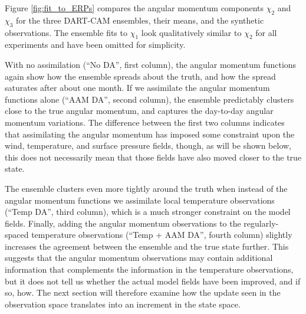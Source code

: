 Figure \ref{fig:fit_to_ERPs} compares the angular momentum components $\chi_2$ and $\chi_3$ for the three DART-CAM ensembles, their means, and the synthetic observations.
The ensemble fits to $\chi_1$ look qualitatively similar to $\chi_2$ for all experiments and have been omitted for simplicity. 

With no assimilation (``No DA'', first column), the angular momentum functions again show how the ensemble spreads about the truth, and how the spread saturates after about one month.
If we assimilate the angular momentum functions alone (``AAM DA'', second column), the ensemble predictably clusters close to the true angular momentum, and captures the day-to-day angular momentum variations. 
The difference between the first two columns indicates that assimilating the angular momentum has imposed some constraint upon the wind, temperature, and surface pressure fields, though, as will be shown below, this does not necessarily mean that those fields have also moved closer to the true state. 

The ensemble clusters even more tightly around the truth when instead of the angular momentum functions we assimilate local temperature observations (``Temp DA'', third column), which is a much stronger constraint on the model fields. 
Finally, adding the angular momentum observations to the regularly-spaced temperature observations (``Temp + AAM DA'', fourth column) slightly increases the agreement between the ensemble and the true state further.  
This suggests that the angular momentum observations may contain additional information that complements the information in the temperature observations, but it does not tell us whether the actual model fields have been improved, and if so, how. 
The next section will therefore examine how the update seen in the observation space translates into an increment in the state space. 
